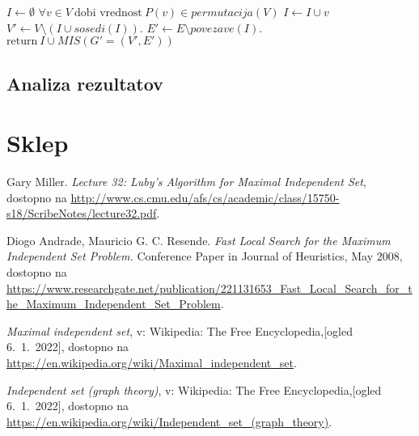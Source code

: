 \documentclass[a4paper, 12pt]{article}
\begin{document}
\begin{algorithm}
    \caption{$lokalno\_iskanje(G, I)$}\label{euclid}
    \begin{algorithmic}[1]
    \State $\textit{I} \gets \emptyset$
    \State $\forall v \in V\ \text{dobi vrednost}\ \textit{P}(v) \in \textit{permutacija}(V)$
    \State $ I \gets I \cup v $
    \EndIf
    \State $V' \gets V \setminus (I \cup \textit{sosedi}(I))$.
    \State $E' \gets E \setminus \textit{povezave}(I)$.
    \State $\text{return}\  I \cup \textit{MIS}(G'=(V', E'))$
    \end{algorithmic}
    \end{algorithm}

\subsection{Analiza rezultatov}

\section{Sklep}

\newpage

\begin{thebibliography}{9}    

    Gary Miller.
    \textit{Lecture 32: Luby’s Algorithm for Maximal Independent Set}, dostopno na \url{http://www.cs.cmu.edu/afs/cs/academic/class/15750-s18/ScribeNotes/lecture32.pdf}.

    Diogo Andrade, Mauricio G. C. Resende.
    \textit{Fast Local Search for the Maximum Independent Set Problem.} Conference Paper in Journal of Heuristics, May 2008, 
    dostopno na \url{https://www.researchgate.net/publication/221131653_Fast_Local_Search_for_the_Maximum_Independent_Set_Problem}.

    \textit{Maximal independent set}, v: Wikipedia: The Free Encyclopedia,[ogled 6.~1.~2022], dostopno na \url{https://en.wikipedia.org/wiki/Maximal_independent_set}.

    \textit{Independent set (graph theory)}, v: Wikipedia: The Free Encyclopedia,[ogled 6.~1.~2022], dostopno na \url{https://en.wikipedia.org/wiki/Independent_set_(graph_theory)}.

    
\end{thebibliography}
\end{document}
